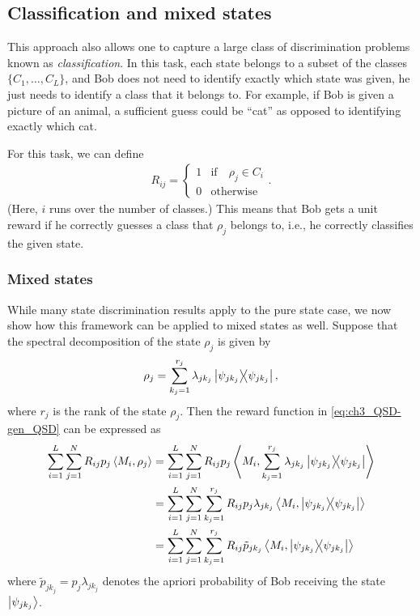 
\subsection{Classification and mixed states} \label{sec:ch3_QSD-class}

This approach also allows one to capture a large class of discrimination problems known as \emph{classification}.
In this task, each state belongs to a subset of the classes $\{C_1, \dots, C_L\}$, and Bob does not need to identify exactly which state was given, he just needs to identify a class that it belongs to. 
For example, if Bob is given a picture of an animal, a sufficient guess could be ``cat'' as opposed to identifying exactly which cat.

For this task, we can define 
\begin{align}
    \label{eq:ch3_QSD-class}
    R_{ij} =
    \begin{cases}
        1 &\text{if} \quad \rho_j \in C_i \\ 
        0 &\text{otherwise}
    \end{cases}. 
\end{align}
(Here, $i$ runs over the number of classes.) 
This means that Bob gets a unit reward if he correctly guesses a class that $\rho_j$ belongs to, i.e., he correctly classifies the given state. 
 
\subsubsection{Mixed states} 

While many state discrimination results apply to the pure state case, we now show how this framework can be applied to mixed states as well.
Suppose that the spectral decomposition of the state $\rho_j$ is given by 
\begin{equation}
    \rho_j = \sum_{k_j=1}^{r_j} \lambda_{jk_j} \ketbra{\psi_{jk_j}}{\psi_{jk_j}},
\end{equation}
where $r_j$ is the rank of the state $\rho_j$.
Then the reward function in \eqref{eq:ch3_QSD-gen_QSD} can be expressed as
\begin{align}
    \label{eq:ch3_QSD-mixed_states}
    \sum_{i=1}^L \sum_{j=1}^N R_{ij} p_j \left\langle M_i, \rho_j \right\rangle 
    &= \sum_{i=1}^L \sum_{j=1}^N R_{ij} p_j \left\langle M_i, \sum_{k_j=1}^{r_j} \lambda_{jk_j} \ketbra{\psi_{jk_j}} \right\rangle \nonumber \\
    &= \sum_{i=1}^L \sum_{j=1}^N \sum_{k_j=1}^{r_j} R_{ij} p_j \lambda_{jk_j} \left\langle M_i, \ketbra{\psi_{jk_j}} \right\rangle \nonumber \\
    &= \sum_{i=1}^L \sum_{j=1}^N \sum_{k_j=1}^{r_j} R_{ij} \tilde{p}_{jk_j} \left\langle M_i, \ketbra{\psi_{jk_j}} \right\rangle
\end{align}
where $\tilde{p}_{jk_j} = p_j \lambda_{jk_j}$ denotes the apriori probability of Bob receiving the state $\ket{\psi_{jk_j}}$. 


